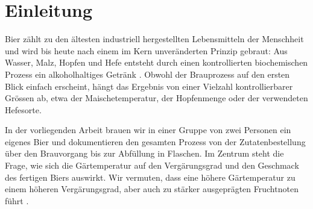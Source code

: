 %
%

\chapter{Einleitung}
\label{kap:einleitung}


Bier zählt zu den ältesten industriell hergestellten Lebensmitteln der
Menschheit und wird bis heute nach einem im Kern unveränderten Prinzip
gebraut: Aus Wasser, Malz, Hopfen und Hefe entsteht durch einen
kontrollierten biochemischen Prozess ein alkoholhaltiges Getränk
\parencite{bruecklmeier2022}. Obwohl der Brauprozess auf den ersten
Blick einfach erscheint, hängt das Ergebnis von einer Vielzahl
kontrollierbarer Grössen ab, etwa der Maischetemperatur, der
Hopfenmenge oder der verwendeten Hefesorte.

In der vorliegenden Arbeit brauen wir in einer Gruppe von zwei Personen
ein eigenes Bier und dokumentieren den gesamten Prozess von der
Zutatenbestellung über den Brauvorgang bis zur Abfüllung in Flaschen.
Im Zentrum steht die Frage, wie sich die Gärtemperatur auf den
Vergärungsgrad und den Geschmack des fertigen Biers auswirkt. Wir
vermuten, dass eine höhere Gärtemperatur zu einem höheren
Vergärungsgrad, aber auch zu stärker ausgeprägten Fruchtnoten führt
.


